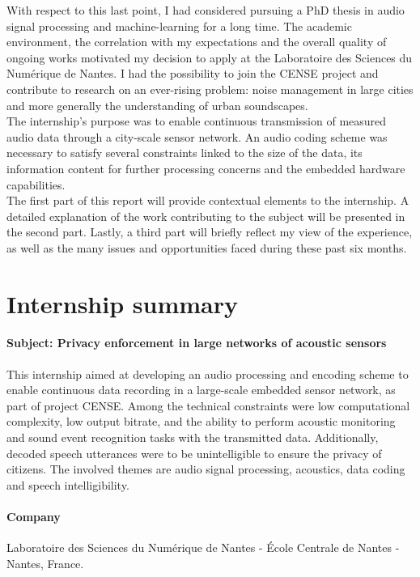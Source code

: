 \documentclass[12pt,times,onecolumn]{article}
\begin{document}
With respect to this last point, I had considered pursuing a PhD thesis in audio signal processing and machine-learning for a long time. The academic environment, the correlation with my expectations and the overall quality of ongoing works motivated my decision to apply at the Laboratoire des Sciences du Num\'erique de Nantes. I had the possibility to join the CENSE project and contribute to research on an ever-rising problem: noise management in large cities and more generally the understanding of urban soundscapes.\\

The internship's purpose was to enable continuous transmission of measured audio data through a city-scale sensor network. An audio coding scheme was necessary to satisfy several constraints linked to the size of the data, its information content for further processing concerns and the embedded hardware capabilities.\\

The first part of this report will provide contextual elements to the internship. A detailed explanation of the work contributing to the subject will be presented in the second part. Lastly, a third part will briefly reflect my view of the experience, as well as the many issues and opportunities faced during these past six months.


\clearpage
\section*{Internship summary}
\paragraph{Subject: Privacy enforcement in large networks of acoustic sensors\\}
This internship aimed at developing an audio processing and encoding scheme to enable continuous data recording in a large-scale embedded sensor network, as part of project CENSE. Among the technical constraints were low computational complexity, low output bitrate, and the ability to perform acoustic monitoring and sound event recognition tasks with the transmitted data. Additionally, decoded speech utterances were to be unintelligible to ensure the privacy of citizens. The involved themes are audio signal processing, acoustics, data coding and speech intelligibility.
\paragraph{Company\\}
Laboratoire des Sciences du Num\'erique de Nantes - \'Ecole Centrale de Nantes - Nantes, France.
\end{document}

